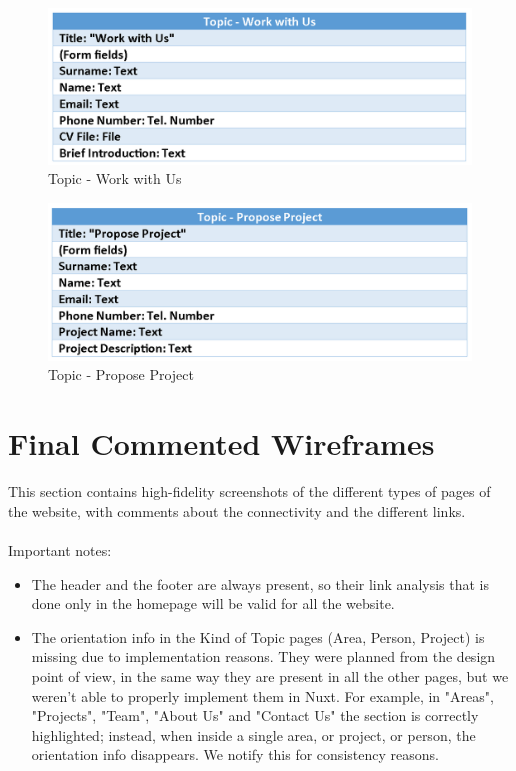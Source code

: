 \documentclass[11pt, letterpaper]{article}
\begin{document}
\begin{figure}[H]
    \centering
    \includegraphics[width=15cm]{images/Content_in_the_small/Topic-work-with-us.png}
    \caption{Topic - Work with Us}
    \label{fig:enter-label}
\end{figure}
\begin{figure}[H]
    \centering
    \includegraphics[width=15cm]{images/Content_in_the_small/Topic-propose_project.png}
    \caption{Topic - Propose Project}
    \label{fig:enter-label}
\end{figure}

\label{sec:final_commented_wireframes}
\section{Final Commented Wireframes}
This section contains high-fidelity screenshots of the different types of pages of the website, with comments about the connectivity and the different links.
\\
\\
Important notes: 
\begin{itemize}
    \item The header and the footer are always present, so their link analysis that is done only in the homepage will be valid for all the website.
    \item The orientation info in the Kind of Topic pages (Area, Person, Project) is missing due to implementation reasons. They were planned from the design point of view, in the same way they are present in all the other pages, but we weren't able to properly implement them in Nuxt. For example, in "Areas", "Projects", "Team", "About Us" and "Contact Us" the section is correctly highlighted; instead, when inside a single area, or project, or person, the orientation info disappears. We notify this for consistency reasons.
\end{itemize}
\end{document}
